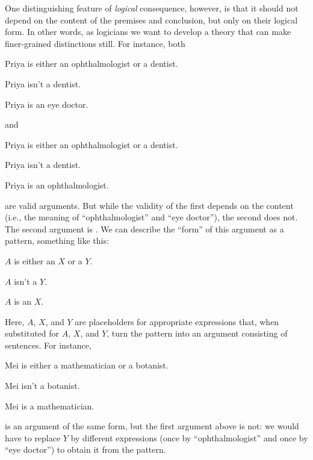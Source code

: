 One distinguishing feature of \emph{logical} consequence, however, is that it should not depend on the content of the premises and conclusion, but only on their logical form. In other words, as logicians we want to develop a theory that can make finer-grained distinctions still. For instance, both
\begin{earg}
	\item[] Priya is either an ophthalmologist or a dentist.
	\item[] Priya isn't a dentist.
	\item[\texttherefore] Priya is an eye doctor.
\end{earg}
and
\begin{earg}
	\item[] Priya is either an ophthalmologist or a dentist.
	\item[] Priya isn't a dentist.
	\item[\texttherefore] Priya is an ophthalmologist.
\end{earg}
are valid arguments. But while the validity of the first depends on the content (i.e., the meaning of ``ophthalmologist'' and ``eye doctor''), the second does not. The second argument is . We can describe the ``form'' of this argument as a pattern, something like this:
\begin{earg}
	\item[] $A$ is either an $X$ or a $Y$.
	\item[] $A$ isn't a $Y$.
	\item[\texttherefore] $A$ is an $X$.
\end{earg}
Here, $A$, $X$, and $Y$ are placeholders for appropriate expressions that, when substituted for $A$, $X$, and $Y$, turn the pattern into an argument consisting of sentences. For instance,
\begin{earg}
	\item[] Mei is either a mathematician or a botanist.
	\item[] Mei isn't a botanist.
	\item[\texttherefore] Mei is a mathematician.
\end{earg}
is an argument of the same form, but the first argument above is not: we would have to replace $Y$ by different expressions (once by ``ophthalmologist'' and once by ``eye doctor'') to obtain it from the pattern.


